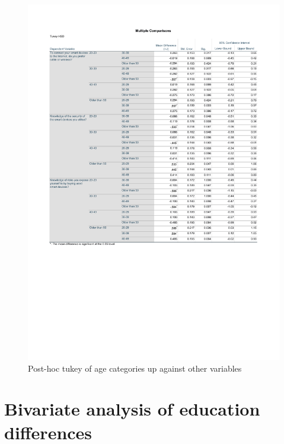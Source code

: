 \begin{figure}[!h]
    \centering
    \includegraphics[scale=0.7]{figures/tables/anova_age_tukey.pdf}
    \caption{Post-hoc tukey of age categories up against other variables}
    \label{fig:anova_age_tukey}
\end{figure}

\chapter{Bivariate analysis of education differences}


